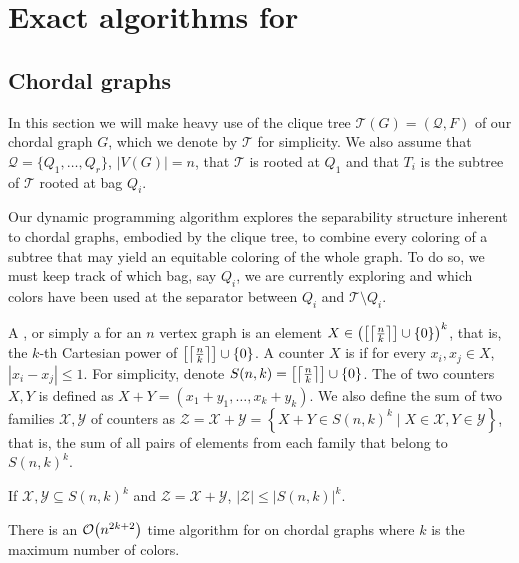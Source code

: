 \section{Exact algorithms for }

\subsection{Chordal graphs}

In this section we will make heavy use of the clique tree $\mathcal{T}(G) = (\mathcal{Q}, F)$ of our chordal graph $G$, which we denote by $\mathcal{T}$ for simplicity.
We also assume that $\mathcal{Q} = \{Q_1, \dots, Q_r\}$, $|V(G)| = n$, that $\mathcal{T}$ is rooted at $Q_1$ and that $T_i$ is the subtree of $\mathcal{T}$ rooted at bag $Q_i$.

Our dynamic programming algorithm explores the separability structure inherent to chordal graphs, embodied by the clique tree, to combine every coloring of a subtree that may yield an equitable coloring of the whole graph.
To do so, we must keep track of which bag, say $Q_i$, we are currently exploring and which colors have been used at the separator between $Q_i$ and $\mathcal{T} \setminus Q_i$.

A , or simply a  for an $n$ vertex graph is an element $X \in \left(\left[\left\lceil\frac{n}{k}\right\rceil\right] \cup \{0\}\right)^k$, that is, the $k$-th Cartesian power of $\left[\left\lceil\frac{n}{k}\right\rceil\right] \cup \{0\}$.
A counter $X$ is  if for every $x_i, x_j \in X$, $|x_i - x_j| \leq 1$.
For simplicity, denote $S(n,k) = \left[\left\lceil\frac{n}{k}\right\rceil\right] \cup \{0\}$.
The  of two counters $X,Y$ is defined as $X + Y = (x_1 + y_1, \dots, x_k + y_k)$.
We also define the sum of two families $\mathcal{X}, \mathcal{Y}$ of counters as $\mathcal{Z} = \mathcal{X} + \mathcal{Y} = \left\{X + Y \in S(n,k)^k \mid X \in \mathcal{X}, Y \in \mathcal{Y} \right\}$, that is, the sum of all pairs of elements from each family that belong to $S(n,k)^k$.

\begin{observation}
    \label{obs:counter_bound}
    If $\mathcal{X}, \mathcal{Y} \subseteq S(n,k)^k$ and $\mathcal{Z} = \mathcal{X} + \mathcal{Y}$, $|\mathcal{Z}| \leq |S(n,k)|^k $.
\end{observation}

\begin{theorem}
    \label{thm:chordal_exp}
    There is an $\mathcal{O}\!\left(n^{2k+2}\right)$ time algorithm for  on chordal graphs where $k$ is the maximum number of colors.
\end{theorem}

